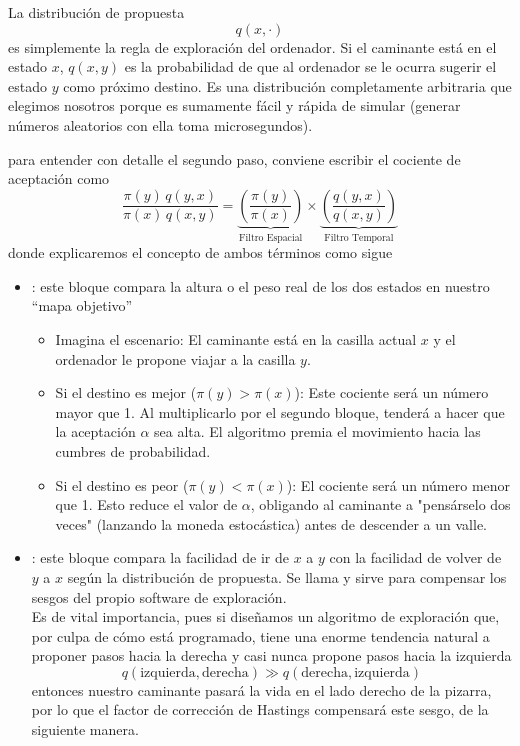 \begin{observacion}
    La distribución de propuesta 
    $$q(x, \cdot)$$
    es simplemente la regla de exploración del ordenador. Si el caminante está en el estado $x$, $q(x, y)$ es la probabilidad de que al ordenador se le ocurra sugerir el estado $y$ como próximo destino. Es una distribución completamente arbitraria que elegimos nosotros porque es sumamente fácil y rápida de simular (generar números aleatorios con ella toma microsegundos). 
\end{observacion}

\begin{observacion}
    para entender con detalle el segundo paso, conviene escribir el cociente de aceptación como
    $$\frac{\pi(y) \, q(y,x)}{\pi(x) \, q(x,y)} = \underbrace{\left( \frac{\pi(y)}{\pi(x)} \right)}_{\text{Filtro Espacial}} \times \underbrace{\left( \frac{q(y,x)}{q(x,y)} \right)}_{\text{Filtro Temporal}}$$
    donde explicaremos el concepto de ambos términos como sigue
    \begin{itemize}
        \item {}: este bloque compara la altura o el peso real de los dos estados en nuestro ``mapa objetivo''  
        \begin{itemize}
            \item Imagina el escenario: El caminante está en la casilla actual $x$ y el ordenador le propone viajar a la casilla $y$.
            \item Si el destino es mejor ($\pi(y) > \pi(x)$): Este cociente será un número mayor que 1. Al multiplicarlo por el segundo bloque, tenderá a hacer que la aceptación $\alpha$ sea alta. El algoritmo premia el movimiento hacia las cumbres de probabilidad. 
            \item Si el destino es peor ($\pi(y) < \pi(x)$): El cociente será un número menor que 1. Esto reduce el valor de $\alpha$, obligando al caminante a "pensárselo dos veces" (lanzando la moneda estocástica) antes de descender a un valle. 
        \end{itemize}
        \item {}: este bloque compara la facilidad de ir de $x$ a $y$ con la facilidad de volver de $y$ a $x$ según la distribución de propuesta. Se llama  y sirve para compensar los sesgos del propio software de exploración. \\
        
        \noindent
        Es de vital importancia, pues si diseñamos un algoritmo de exploración que, por culpa de cómo está programado, tiene una enorme tendencia natural a proponer pasos hacia la derecha y casi nunca propone pasos hacia la izquierda 
        $$q(\text{izquierda},\text{derecha}) \gg q(\text{derecha},\text{izquierda})$$ entonces nuestro caminante pasará la vida en el lado derecho de la pizarra, por lo que el 
        factor de corrección de Hastings compensará este sesgo, de la siguiente manera. \\


\end{itemize}
\end{observacion}
